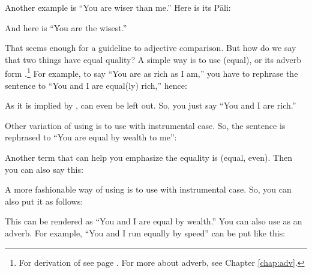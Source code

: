 
Another example is ``You are wiser than me.'' Here is its P\=ali:


And here is ``You are the wisest.''


That seems enough for a guideline to adjective comparison. But how do we say that two things have equal quality? A simple way is to use  (equal), or its adverb form .\footnote{For derivation of  see page \pageref{par:kiidisa}. For more about adverb, see Chapter \ref{chap:adv}.} For example, to say ``You are as rich as I am,'' you have to rephrase the sentence to ``You and I are equal(ly) rich,'' hence:


As it is implied by ,  can even be left out. So, you just say ``You and I are rich.''


Other variation of using  is to use with instrumental case. So, the sentence is rephrased to ``You are equal by wealth to me'':


Another term that can help you emphasize the equality is  (equal, even). Then you can also say this:


A more fashionable way of using  is to use with instrumental case. So, you can also put it as follows:


This can be rendered as ``You and I are equal by wealth.'' You can also use  as an adverb. For example, ``You and I run equally by speed'' can be put like this:

